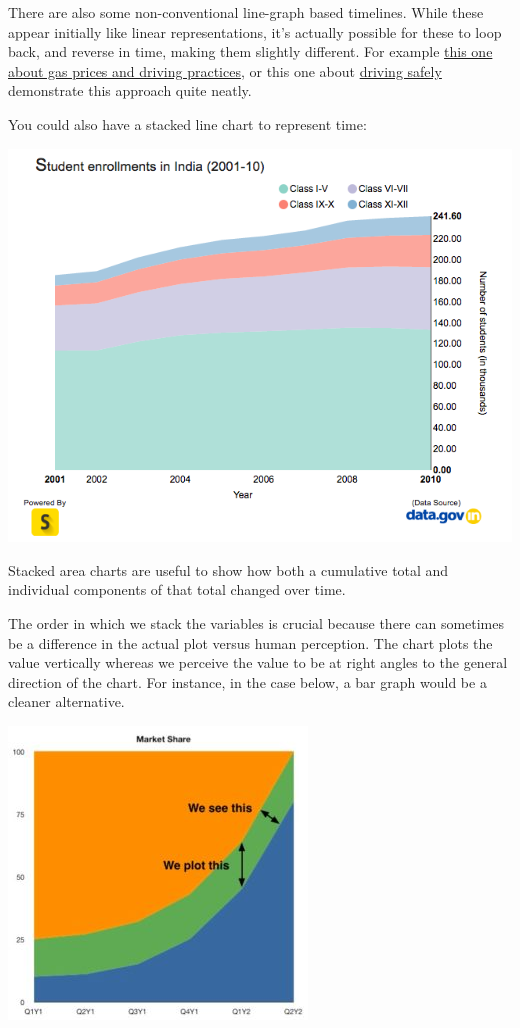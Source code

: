 \documentclass[
]{book}
\begin{document}
There are also some non-conventional line-graph based timelines. While these appear initially like linear representations, it's actually possible for these to loop back, and reverse in time, making them slightly different. For example \href{http://www.nytimes.com/imagepages/2010/05/02/business/02metrics.html}{this one about gas prices and driving practices}, or this one about \href{http://www.nytimes.com/interactive/2012/09/17/science/driving-safety-in-fits-and-starts.html}{driving safely} demonstrate this approach quite neatly.

You could also have a stacked line chart to represent time:

\includegraphics{imgs/other_time_graph_1.png}

Stacked area charts are useful to show how both a cumulative total and individual components of that total changed over time.

The order in which we stack the variables is crucial because there can sometimes be a difference in the actual plot versus human perception. The chart plots the value vertically whereas we perceive the value to be at right angles to the general direction of the chart. For instance, in the case below, a bar graph would be a cleaner alternative.

\includegraphics{imgs/other_time_graph_2.jpg}
\end{document}
